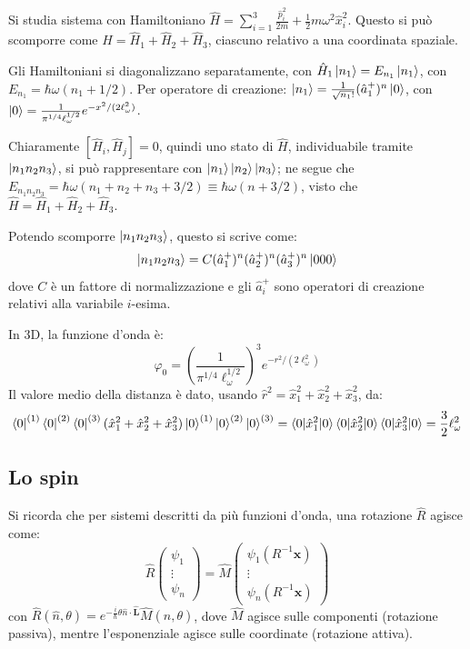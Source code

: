 \documentclass[10pt, a4paper]{scrartcl} %
\numberwithin{equation}{subsection}
\theoremstyle{style2}
\theoremstyle{style1}
\begin{document}
Si studia sistema con Hamiltoniano $\hat{H}= \sum_{i=1}^{3} \frac{\hat{p}_i^2}{2m} + \frac{1}{2} m\omega^2 \hat{x}_i^2$. Questo si pu\`o scomporre come $\hat{H} = \hat{H}_1 + \hat{H}_2 + \hat{H}_3$, ciascuno relativo a una coordinata spaziale.

Gli Hamiltoniani si diagonalizzano separatamente, con $\hat{H}_1 \ket{n_1}  = E_{n_1}  \ket{n_1} $, con $E_{n_1} = \hbar  \omega (n_1 + 1 / 2)$. Per operatore di creazione: $\ket{n_1} = \frac{1}{\sqrt{n_1} !} (\hat{a}_1^{+})^n  \ket{0} $, con $\ket{0}  = \frac{1}{\pi^{ 1/4} \ell _\omega ^{1 / 2}}   e^{ - x^2 / (2 \ell _\omega^{2})} $.

Chiaramente $[\hat{H}_i, \hat{H}_j] = 0$, quindi uno stato di $\hat{H}$, individuabile tramite $\ket{ n_1 n_2n_3} $, si pu\`o rappresentare con $\ket{n_1} \ket{n_2} \ket{n_3} $; ne segue che $E_{n_1n_2n_3} = \hbar \omega(n_1+n_2+n_3 + 3 / 2) \equiv \hbar \omega (n+ 3 / 2)$, visto che $\hat{H}= \hat{H}_1 + \hat{H}_2 +\hat{H}_3$.

Potendo scomporre $\ket{n_1n_2n_3} $, questo si scrive come:
\[
\ket{n_1n_2n_3} = C (\hat{a}_1^+)^n(\hat{a}_2^+)^n(\hat{a}_3^+)^n \ket{0 0 0} 
\] 
dove $C $ \`e un fattore di normalizzazione e gli $\hat{a}_i^+$ sono operatori di creazione relativi alla variabile $i$-esima.

In 3D, la funzione d'onda \`e:
\begin{equation}
	\varphi _0 = \left(\frac{1}{\pi^{1 / 4} \ell _\omega^{1 / 2} }\right) ^3 e^{- r^2 / (2\ell _\omega^2)} 
\end{equation}
Il valore medio della distanza \`e dato, usando $\hat{r}^2 = \hat{x}^2_1 + \hat{x}_2^2 + \hat{x}^2_3$, da:
\[
	\bra{0} ^{(1)} \bra{0} ^{(2)} \bra{0}^{(3)} ( \hat{x}_1^2 + \hat{x}_2^2 + \hat{x}_3^2 )\ket{0} ^{(1)}  \ket{0} ^{(2)} \ket{0} ^{(3)} = \braket{0|\hat{x}_1^2|0} \braket{0|\hat{x}_2^2|0} \braket{0|\hat{x}_3^2|0} =\frac{3}{2}\ell _\omega^2
\] 

\subsection{Lo spin}
Si ricorda che per sistemi descritti da pi\`u funzioni d'onda, una rotazione $\hat{R}$ agisce come:
\[
\hat{R} \begin{pmatrix} \psi_1 \\ \vdots\\ \psi _n \end{pmatrix} = \hat{M} \begin{pmatrix} \psi _1(R^{-1} \mathbf{x} ) \\ \vdots \\ \psi _n(R^{-1} \mathbf{x} )\end{pmatrix} 
\] 
con $\hat{R}(\hat{n},\theta ) = e^{- \frac{i}{\hbar } \theta  \hat{n}\cdot \hat{\mathbf{L}} } \hat{M}(\hat{n},\theta ) $, dove $\hat{M}$ agisce sulle componenti (rotazione passiva), mentre l'esponenziale agisce sulle coordinate (rotazione attiva).
\end{document}
